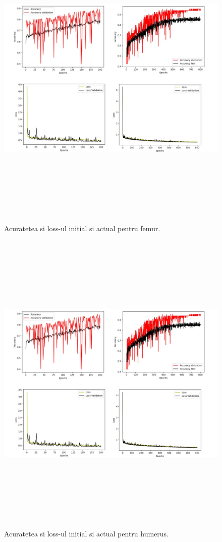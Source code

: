\documentclass[runningheads,a4paper,11pt]{report}
\begin{document}
\begin{figure}
    \centering
    \includegraphics[width=20cm,height=15cm]{Imagini/loss_acuratete_femur.png}
    \caption{Acuratetea si loss-ul initial si actual pentru femur.}
    \label{loss_femur}
\end{figure}

\begin{figure}
    \centering
    \includegraphics[width=20cm,height=15cm]{Imagini/loss_acuratete_humerus.png}
    \caption{Acuratetea si loss-ul initial si actual pentru humerus.}
    \label{loss_humerus}
\end{figure}
\end{document}
